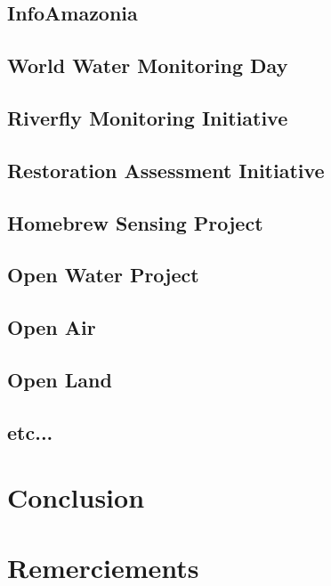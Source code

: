 \documentclass[10pt, conference, compsocconf]{llncs}
\begin{document}
\subsection{InfoAmazonia}
\subsection{World Water Monitoring Day}
\subsection{Riverfly Monitoring Initiative}
\subsection{Restoration Assessment Initiative}
\subsection{Homebrew Sensing Project}
\subsection{Open Water Project}
\subsection{Open Air}
\subsection{Open Land}
\subsection{etc...}

\section{Conclusion}\label{sec:conclusion}

\section*{Remerciements}




\end{document}
